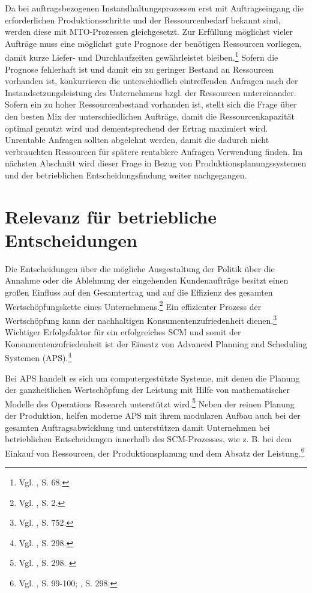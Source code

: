 Da bei auftragsbezogenen Instandhaltungsprozessen erst mit Auftragseingang die erforderlichen Produktionsschritte und der Ressourcenbedarf bekannt sind, werden diese mit MTO-Prozessen gleichgesetzt. Zur Erfüllung möglichst vieler Aufträge muss eine möglichst gute Prognose der benötigen Ressourcen vorliegen, damit kurze Liefer- und Durchlaufzeiten gewährleistet bleiben.\footnote{Vgl. \cite{thaler2001supply}, S. 68.} Sofern die Prognose fehlerhaft ist und damit ein zu geringer Bestand an Ressourcen vorhanden ist, konkurrieren die unterschiedlich eintreffenden Anfragen nach der Instandsetzungsleistung des Unternehmens bzgl. der Ressourcen untereinander. Sofern ein zu hoher Ressourcenbestand vorhanden ist, stellt sich die Frage über den besten Mix der unterschiedlichen Aufträge, damit die Ressourcenkapazität optimal genutzt wird und dementsprechend der Ertrag maximiert wird. Unrentable Anfragen sollten abgelehnt werden, damit die dadurch nicht verbrauchten Ressourcen für spätere rentablere Anfragen Verwendung finden. Im nächsten Abschnitt wird dieser Frage in Bezug von Produktionsplanungssystemen und der betrieblichen Entscheidungsfindung weiter nachgegangen.


\section{Relevanz für betriebliche Entscheidungen}

Die Entscheidungen über die mögliche Ausgestaltung der Politik über die Annahme oder die Ablehnung der eingehenden Kundenaufträge besitzt einen großen Einfluss auf den Gesamtertrag und auf die Effizienz des gesamten Wertschöpfungskette eines Unternehmens.\footnote{Vgl. \cite{talluri2004theory}, S. 2.} Ein effizienter Prozess der Wertschöpfung kann der nachhaltigen Konsumentenzufriedenheit dienen.\footnote{Vgl. \cite{Heikkila2002747}, S. 752.} Wichtiger Erfolgsfaktor für ein erfolgreiches SCM und somit der Konsumentenzufriedenheit ist der Einsatz von Advanced Planning and Scheduling Systemen (APS).\footnote{Vgl. \cite{fleischmeyr2004codp}, S. 298.}

Bei APS handelt es sich um computergestützte Systeme, mit denen die Planung der ganzheitlichen Wertschöpfung der Leistung mit Hilfe von mathematischer Modelle des Operations Research unterstützt wird.\footnote{Vgl. \cite{fleischmeyr2004codp}, S. 298. \label{fleisch}} Neben der reinen Planung der Produktion, helfen moderne APS mit ihrem modularen Aufbau auch bei der gesamten Auftragsabwicklung und unterstützen damit Unternehmen bei betrieblichen Entscheidungen innerhalb des SCM-Prozesses, wie z. B. bei dem Einkauf von Ressourcen, der Produktionsplanung und dem Absatz der Leistung.\footnote{Vgl. \cite{meyr2015structure}, S. 99-100; \cite{fleischmeyr2004codp}, S. 298.}

